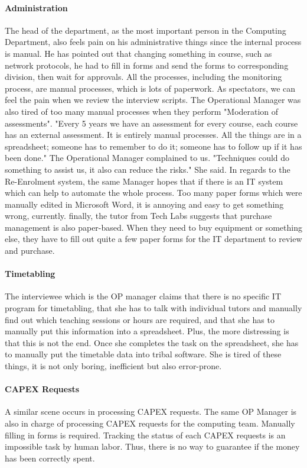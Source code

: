 \paragraph{Administration}
The head of the department, as the most important person in the Computing Department, also feels pain on his administrative things since the internal process is manual. He has pointed out that changing something in course, such as network protocols, he had to fill in forms and send the forms to corresponding division, then wait for approvals. All the processes, including the monitoring process, are manual processes, which is lots of paperwork. As spectators, we can feel the pain when we review the interview scripts. The Operational Manager was also tired of too many manual processes when they perform "Moderation of assessments". "Every 5 years we have an assessment for every course, each course has an external assessment. It is entirely manual processes. All the things are in a spreadsheet; someone has to remember to do it; someone has to follow up if it has been done." The Operational Manager complained to us. "Techniques could do something to assist us, it also can reduce the risks." She said. In regards to the Re-Enrolment system, the same Manager hopes that if there is an IT system which can help to automate the whole process. Too many paper forms which were manually edited in Microsoft Word, it is annoying and easy to get something wrong, currently. finally, the tutor from Tech Labs suggests that purchase management is also paper-based. When they need to buy equipment or something else, they have to fill out quite a few paper forms for the IT department to review and purchase.

\paragraph{Timetabling}
The interviewee which is the OP manager claims that there is no specific IT program for timetabling, that she has to talk with individual tutors and manually find out which teaching sessions or hours are required, and that she has to manually put this information into a spreadsheet. Plus, the more distressing is that this is not the end. Once she completes the task on the spreadsheet, she has to manually put the timetable data into tribal software. She is tired of these things, it is not only boring, inefficient but also error-prone. 

\paragraph{CAPEX Requests}
A similar scene occurs in processing CAPEX requests. The same OP Manager is also in charge of processing CAPEX requests for the computing team. Manually filling in forms is required. Tracking the status of each CAPEX requests is an impossible task by human labor. Thus, there is no way to guarantee if the money has been correctly spent.

